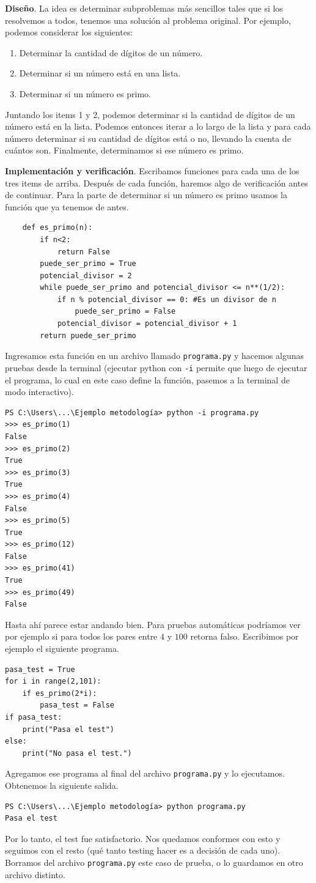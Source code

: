 \documentclass[a4paper, 12pt]{report}
\theoremstyle{definition}
\begin{document}
{\bf Diseño}. La idea es determinar subproblemas más sencillos tales que si los resolvemos a todos, tenemos una solución al problema original. Por ejemplo, podemos considerar los siguientes:
\begin{enumerate}
	\item Determinar la cantidad de dígitos de un número.
	\item Determinar si un número está en una lista.
	\item Determinar si un número es primo.
\end{enumerate}
Juntando los items 1 y 2, podemos determinar si la cantidad de dígitos de un número está en la lista. Podemos entonces iterar a lo largo de la lista y para cada número determinar si su cantidad de dígitos está o no, llevando la cuenta de cuántos son. Finalmente, determinamos si ese número es primo.

{\bf Implementación y verificación}. Escribamos funciones para cada una de los tres items de arriba. Después de cada función, haremos algo de verificación antes de continuar. Para la parte de determinar si un número es primo usamos la función que ya tenemos de antes.

\begin{verbatim}
	def es_primo(n):
	    if n<2:
	        return False
	    puede_ser_primo = True
	    potencial_divisor = 2
	    while puede_ser_primo and potencial_divisor <= n**(1/2):
	        if n % potencial_divisor == 0: #Es un divisor de n
	            puede_ser_primo = False
	        potencial_divisor = potencial_divisor + 1
	    return puede_ser_primo
\end{verbatim}

Ingresamos esta función en un archivo llamado {\tt programa.py} y hacemos algunas pruebas desde la terminal (ejecutar python con {\tt-i} permite que luego de ejecutar el programa, lo cual en este caso define la función, pasemos a la terminal de modo interactivo).
\begin{verbatim}
PS C:\Users\...\Ejemplo metodología> python -i programa.py
>>> es_primo(1)
False
>>> es_primo(2)
True
>>> es_primo(3)
True
>>> es_primo(4)
False
>>> es_primo(5)
True
>>> es_primo(12)
False
>>> es_primo(41)
True
>>> es_primo(49)
False
\end{verbatim}
Hasta ahí parece estar andando bien. Para pruebas automáticas podríamos ver por ejemplo si para todos los pares entre $4$ y $100$ retorna falso. Escribimos por ejemplo el siguiente programa.
\begin{verbatim}
pasa_test = True
for i in range(2,101):
    if es_primo(2*i):
        pasa_test = False
if pasa_test:
    print("Pasa el test")
else:
    print("No pasa el test.")
\end{verbatim}
Agregamos ese programa al final del archivo {\tt programa.py} y lo ejecutamos. Obtenemos la siguiente salida.
\begin{verbatim}
PS C:\Users\...\Ejemplo metodología> python programa.py
Pasa el test
\end{verbatim}
Por lo tanto, el test fue satisfactorio. Nos quedamos conformes con esto y seguimos con el resto (qué tanto testing hacer es a decisión de cada uno). Borramos del archivo {\tt programa.py} este caso de prueba, o lo guardamos en otro archivo distinto.
\end{document}
